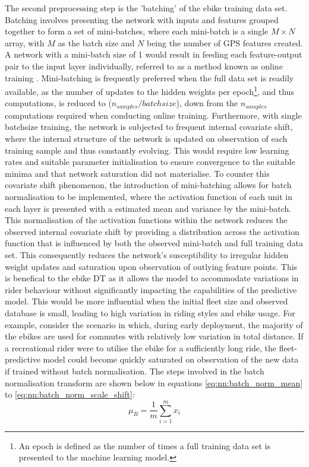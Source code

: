 \documentclass[a4paper, 10pt]{article}
\numberwithin{equation}{section}
\begin{document}
The second preprocessing step is the 'batching' of the ebike training data set. Batching involves presenting the network with inputs and features grouped together to form a set of mini-batches, where each mini-batch is a single $M \times N$ array, with $M$ as the batch size and $N$ being the number of GPS features created. A network with a mini-batch size of 1 would result in feeding each feature-output pair to the input layer individually, referred to as a method known as online training \cite{nn:online_learning}. Mini-batching is frequently preferred when the full data set is readily available, as the number of updates to the hidden weights per epoch\footnote{An epoch is defined as the number of times a full training data set is presented to the machine learning model.}, and thus computations, is reduced to \big($n_{samples} / batchsize$\big), down from the $n_{samples}$ computations required when conducting online training. Furthermore, with single batchsize training, the network is subjected to frequent internal covariate shift, where the internal structure of the network is updated on observation of each training sample and thus constantly evolving. This would require low learning rates and suitable parameter initialisation to ensure convergence to the suitable minima and that network saturation did not materialise. To counter this covariate shift phenomenon, the introduction of mini-batching allows for batch normalisation \cite{nn:google_batch_norm} to be implemented, where the activation function of each unit in each layer is presented with a estimated mean and variance by the mini-batch. This normalisation of the activation functions within the network reduces the observed internal covariate shift by providing a distribution across the activation function that is influenced by both the observed mini-batch and full training data set. This consequently reduces the network's susceptibility to irregular hidden weight updates and saturation upon observation of outlying feature points. This is benefical to the ebike DT as it allows the model to accommodate variations in rider behaviour without significantly impacting the capabilities of the predictive model. This would be more influential when the initial fleet size and observed database is small, leading to high variation in riding styles and ebike usage. For example, consider the scenario in which, during early deployment, the majority of the ebikes are used for commutes with relatively low variation in total distance. If a recreational rider were to utilise the ebike for a sufficiently long ride, the fleet-predictive model could become quickly saturated on observation of the new data if trained without batch normalisation. The steps involved in the batch normalisation transform are shown below in equations \ref{eq:nn:batch_norm_mean} to \ref{eq:nn:batch_norm_scale_shift}:
\begin{equation}
    \label{eq:nn:batch_norm_mean}
    \mu_{B} = \frac{1}{m} \sum^{m}_{i=1} x_{i}
\end{equation}
\end{document}

